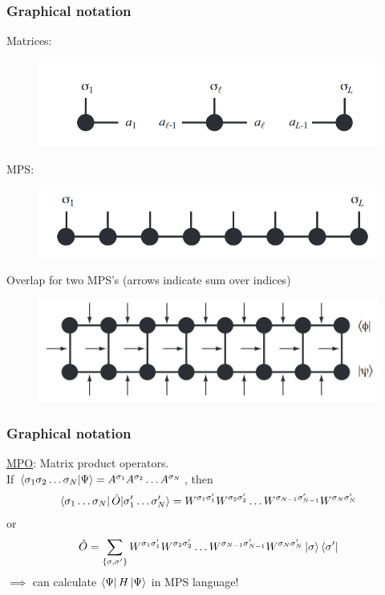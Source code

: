 \documentclass{beamer}
\theoremstyle{definition}
\begin{document}
\begin{frame}
	\frametitle{Graphical notation}
	Matrices:
	\vspace{-10pt}
	\begin{figure}[!htb]
		\centering
		\includegraphics[scale=0.3]{matrix.png}
	\end{figure}
\vspace{-10pt}
	MPS:
	\vspace{-10pt}
	\begin{figure}[!htb]
		\centering
		\includegraphics[scale=0.32]{mps.png}
	\end{figure}
	Overlap for two MPS's (arrows indicate sum over indices)
	\vspace{-6pt}
	\begin{figure}[!htb]
		\centering
		\includegraphics[scale=0.28]{overlap.png}
	\end{figure}
\end{frame}



\begin{frame}
	\frametitle{Graphical notation}
	\underline{MPO}: Matrix product operators. \\
	
	\vspace{10pt}
	If $\bra{\sigma_1\sigma_2\dots \sigma_N} \ket{\Psi} = A^{\sigma_1}A^{\sigma_2}\dots A^{\sigma_N}$, then
	\begin{align*}
		\bra{\sigma_1\dots \sigma_N} \hat{O} |\sigma_1'\dots \sigma_N'\rangle = W^{\sigma_1\sigma'_1}W^{\sigma_2\sigma'_2}\dots W^{\sigma_{N-1}\sigma'_{N-1}}W^{\sigma_N\sigma'_N}
	\end{align*} 
	or
	\begin{align*}
		\hat{O} = \sum_{\{\sigma,\sigma'\}} W^{\sigma_1\sigma'_1}W^{\sigma_2\sigma'_2}\dots W^{\sigma_{N-1}\sigma'_{N-1}}W^{\sigma_N\sigma'_N} \ket{\sigma}\langle \sigma'|
	\end{align*}
	$\implies$ can calculate $\bra{\Psi} H \ket{\Psi}$ in MPS language!
\end{frame}
\end{document}
